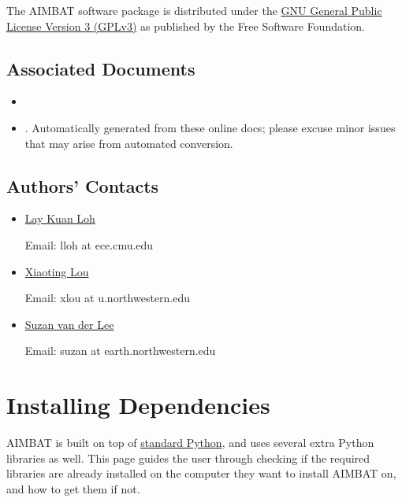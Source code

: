 \documentclass[letterpaper,10pt,english]{sphinxmanual}
\begin{document}
The AIMBAT software package is distributed under the \href{http://www.gnu.org/licenses/gpl.html}{GNU General Public License Version 3 (GPLv3)} as published by the Free Software Foundation.


\section{Associated Documents}
\label{docfiles/introduction:associated-documents}\begin{itemize}
\item {} 

\item {} 
. Automatically generated from these online docs; please excuse minor issues that may arise from automated conversion.

\end{itemize}


\section{Authors' Contacts}
\label{docfiles/introduction:authors-contacts}\label{docfiles/introduction:id5}\begin{itemize}
\item {} 
\href{http://lkloh2410.wordpress.com/}{Lay Kuan Loh}

Email: lloh at ece.cmu.edu

\item {} 
\href{http://www.earth.northwestern.edu/~xlou/Welcome.html}{Xiaoting Lou}

Email: xlou at u.northwestern.edu

\item {} 
\href{http://www.earth.northwestern.edu/research/suzan/}{Suzan van der Lee}

Email: suzan at earth.northwestern.edu

\end{itemize}


\chapter{Installing Dependencies}
\label{docfiles/install_dependencies:installing-dependencies}\label{docfiles/install_dependencies::doc}
AIMBAT is built on top of \href{https://www.python.org/}{standard Python}, and uses several extra Python libraries as well. This page guides the user through checking if the required libraries are already installed on the computer they want to install AIMBAT on, and how to get them if not.
\end{document}
